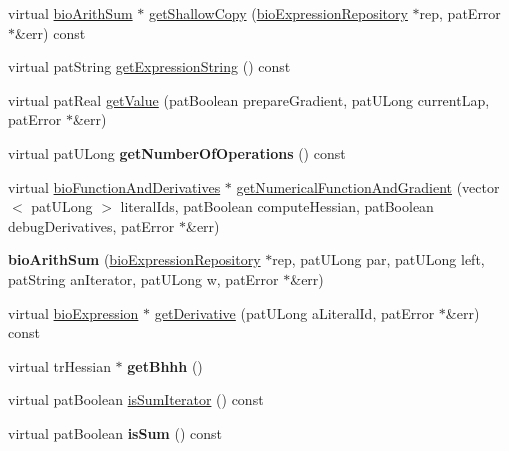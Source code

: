 \begin{DoxyCompactItemize}
\item 
virtual \hyperlink{classbio_arith_sum}{bio\+Arith\+Sum} $\ast$ \hyperlink{classbio_arith_sum_a0828ed33f49201118b143dfa336d9212}{get\+Shallow\+Copy} (\hyperlink{classbio_expression_repository}{bio\+Expression\+Repository} $\ast$rep, pat\+Error $\ast$\&err) const
\item 
virtual pat\+String \hyperlink{classbio_arith_sum_a1354d70bccf4ba5e3d8ca634005d5489}{get\+Expression\+String} () const
\item 
virtual pat\+Real \hyperlink{classbio_arith_sum_a3705cb2f1aebf4541131df5638a33379}{get\+Value} (pat\+Boolean prepare\+Gradient, pat\+U\+Long current\+Lap, pat\+Error $\ast$\&err)
\item 
\mbox{\label{classbio_arith_sum_ab192ab3a089be64024a110d94a341fb3}} 
virtual pat\+U\+Long {\bfseries get\+Number\+Of\+Operations} () const
\item 
virtual \hyperlink{classbio_function_and_derivatives}{bio\+Function\+And\+Derivatives} $\ast$ \hyperlink{classbio_arith_sum_afe9b54bab626e9dbe2b3aefebbcb6f8f}{get\+Numerical\+Function\+And\+Gradient} (vector$<$ pat\+U\+Long $>$ literal\+Ids, pat\+Boolean compute\+Hessian, pat\+Boolean debug\+Derivatives, pat\+Error $\ast$\&err)
\item 
\mbox{\label{classbio_arith_sum_af5f0818c44873b2cb1c10769468dca23}} 
{\bfseries bio\+Arith\+Sum} (\hyperlink{classbio_expression_repository}{bio\+Expression\+Repository} $\ast$rep, pat\+U\+Long par, pat\+U\+Long left, pat\+String an\+Iterator, pat\+U\+Long w, pat\+Error $\ast$\&err)
\item 
virtual \hyperlink{classbio_expression}{bio\+Expression} $\ast$ \hyperlink{classbio_arith_sum_a2c030d0fea64581fe6f33031d3d3c977}{get\+Derivative} (pat\+U\+Long a\+Literal\+Id, pat\+Error $\ast$\&err) const
\item 
\mbox{\label{classbio_arith_sum_ae22ebe2bc507588c53bdac6144381adf}} 
virtual tr\+Hessian $\ast$ {\bfseries get\+Bhhh} ()
\item 
virtual pat\+Boolean \hyperlink{classbio_arith_sum_ab0747dc4d0f4fbe2cb246b265ec3cd11}{is\+Sum\+Iterator} () const
\item 
\mbox{\label{classbio_arith_sum_ac2adee4ec319273e2e571a5dc3fd5fdf}} 
virtual pat\+Boolean {\bfseries is\+Sum} () const

\end{DoxyCompactItemize}
